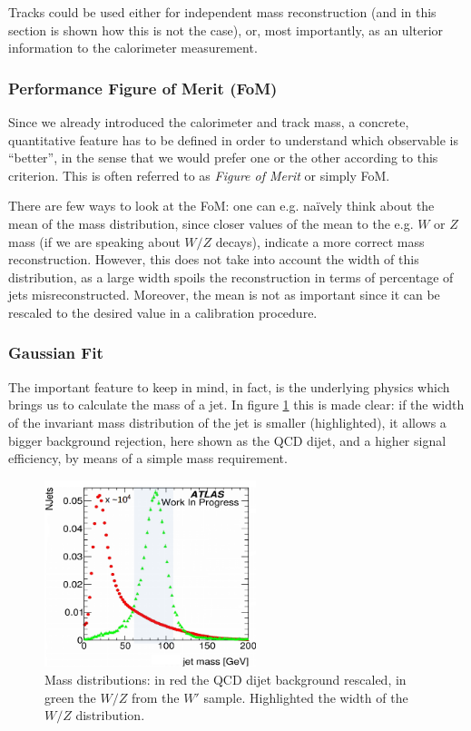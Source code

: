Tracks could be used either for independent mass reconstruction (and in this section is shown how this is not the case), or, most importantly, as an ulterior information to the calorimeter measurement.

\subsubsection{Performance Figure of Merit (FoM)}
Since we already introduced the calorimeter and track mass, a concrete, quantitative feature has to be defined in order to understand which observable is ``better'', in the sense that we would prefer one or the other according to this criterion. This is often referred to as \textit{Figure of Merit} or simply FoM.

There are few ways to look at the FoM: one can e.g. na\"ively think about the mean of the mass distribution, since closer values of the mean to the e.g. $W$ or $Z$ mass (if we are speaking about $W/Z$ decays), indicate a more correct mass reconstruction. However, this does not take into account the width of this distribution, as a large width spoils the reconstruction in terms of percentage of jets misreconstructed. Moreover, the mean is not as important since it can be rescaled to the desired value in a calibration procedure.

\subsubsection{Gaussian Fit}

The important feature to keep in mind, in fact, is the underlying physics which brings us to calculate the mass of a jet. In figure \ref{fig:search} this is made clear: if the width of the invariant mass distribution of the jet is smaller (highlighted), it allows a bigger background rejection, here shown as the QCD dijet, and a higher signal efficiency, by means of a simple mass requirement.

\begin{figure}[!ht]
  \centering
      \includegraphics[width=0.55\textwidth]{jet_part/search.png}
  \caption[QCD and $W'$ mass distribution]{Mass distributions: in red the QCD dijet background rescaled, in green the $W/Z$ from the $W'$ sample. Highlighted the width of the $W/Z$ distribution.}
  \label{fig:search}
\end{figure}


